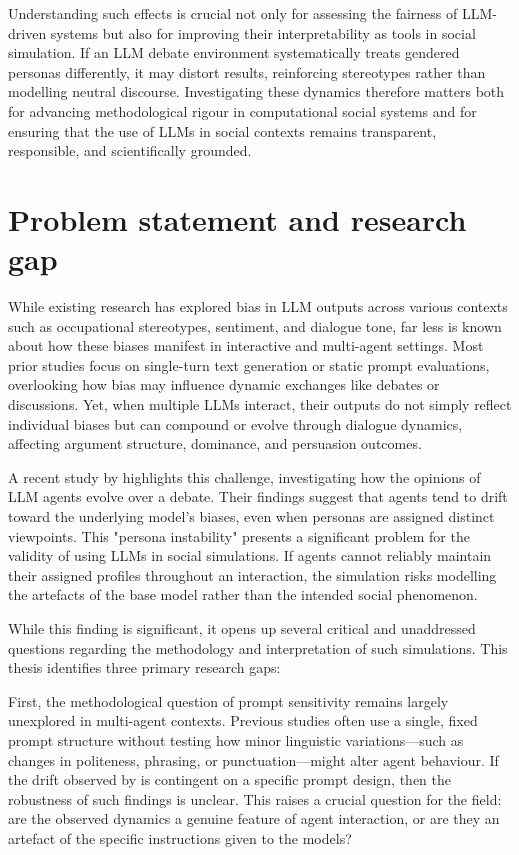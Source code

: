 Understanding such effects is crucial not only for assessing the fairness of LLM-driven systems but also for improving their interpretability as tools in social simulation. If an LLM debate environment systematically treats gendered personas differently, it may distort results, reinforcing stereotypes rather than modelling neutral discourse. Investigating these dynamics therefore matters both for advancing methodological rigour in computational social systems and for ensuring that the use of LLMs in social contexts remains transparent, responsible, and scientifically grounded.


\section{Problem statement and research gap}

While existing research has explored bias in LLM outputs across various contexts such as occupational stereotypes, sentiment, and dialogue tone, far less is known about how these biases manifest in interactive and multi-agent settings. Most prior studies focus on single-turn text generation or static prompt evaluations, overlooking how bias may influence dynamic exchanges like debates or discussions. Yet, when multiple LLMs interact, their outputs do not simply reflect individual biases but can compound or evolve through dialogue dynamics, affecting argument structure, dominance, and persuasion outcomes.

A recent study by \citet{taubenfeld_systematic_2024} highlights this challenge, investigating how the opinions of LLM agents evolve over a debate. Their findings suggest that agents tend to drift toward the underlying model's biases, even when personas are assigned distinct viewpoints. This "persona instability" presents a significant problem for the validity of using LLMs in social simulations. If agents cannot reliably maintain their assigned profiles throughout an interaction, the simulation risks modelling the artefacts of the base model rather than the intended social phenomenon.

While this finding is significant, it opens up several critical and unaddressed questions regarding the methodology and interpretation of such simulations. This thesis identifies three primary research gaps:

First, the methodological question of prompt sensitivity remains largely unexplored in multi-agent contexts. Previous studies often use a single, fixed prompt structure without testing how minor linguistic variations—such as changes in politeness, phrasing, or punctuation—might alter agent behaviour. If the drift observed by \cite{taubenfeld_systematic_2024} is contingent on a specific prompt design, then the robustness of such findings is unclear. This raises a crucial question for the field: are the observed dynamics a genuine feature of agent interaction, or are they an artefact of the specific instructions given to the models?

